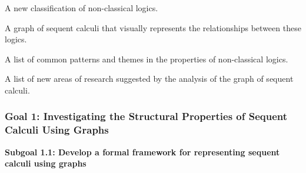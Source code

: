 A new classification of non-classical logics.

A graph of sequent calculi that visually represents the relationships
between these logics.

A list of common patterns and themes in the properties of non-classical
logics.

A list of new areas of research suggested by the analysis of the graph
of sequent calculi.

\hypertarget{section}{%
\subsubsection{}\label{section}}

\hypertarget{section-1}{%
\subsubsection{}\label{section-1}}

\hypertarget{section-2}{%
\subsubsection{}\label{section-2}}

\hypertarget{goal-1-investigating-the-structural-properties-of-sequent-calculi-using-graphs}{%
\subsubsection{Goal 1: Investigating the Structural Properties of
Sequent Calculi Using
Graphs}\label{goal-1-investigating-the-structural-properties-of-sequent-calculi-using-graphs}}

\textbf{Subgoal 1.1: Develop a formal framework for representing sequent
calculi using graphs}

